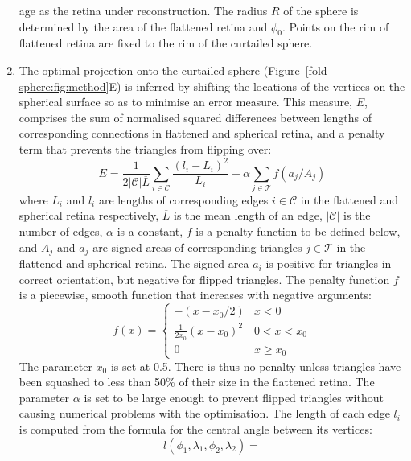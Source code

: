 \documentclass[10pt]{article}
\begin{document}
\begin{enumerate}
  age as the retina under reconstruction. The radius $R$ of the sphere
  is determined by the area of the flattened retina and $\phi_0$.
  Points on the rim of flattened retina are fixed to the rim of the
  curtailed sphere.
\item The optimal projection onto the curtailed sphere
  (Figure~\ref{fold-sphere:fig:method}E) is inferred by shifting the
  locations of the vertices on the spherical surface so as to minimise
  an error measure. This measure, $E$, comprises the sum of normalised
  squared differences between lengths of corresponding connections in
  flattened and spherical retina, and a penalty term that prevents the
  triangles from flipping over:
  \begin{equation}
    E = \frac{1}{2|\mathcal{C}|\overline{L}} \sum_{i\in\mathcal{C}} \frac{(l_i - L_i)^2}{L_i}  
    + \alpha\sum_{j\in\mathcal{T}} f(a_j/A_j)
  \end{equation}
  where $L_i$ and $l_i$ are lengths of corresponding edges
  $i\in\mathcal{C}$ in the flattened and spherical retina
  respectively, $\overline{L}$ is the mean length of an edge,
  $|\mathcal{C}|$ is the number of edges, $\alpha$ is a constant, $f$
  is a penalty function to be defined below, and $A_j$ and $a_j$ are
  signed areas of corresponding triangles $j\in\mathcal{T}$ in the
  flattened and spherical retina.  The signed area $a_i$ is positive
  for triangles in correct orientation, but negative for flipped
  triangles. The penalty function $f$ is a piecewise, smooth function
  that increases with negative arguments:
  \begin{equation}
    \label{retistruct_plos:eq:1}
    f(x) = \left\{
        \begin{array}{ll}
          -(x - x_0/2) & x < 0 \\
          \frac{1}{2x_0}(x - x_0)^2 & 0 < x <x_0 \\
          0 & x \ge x_0
          \end{array} \right.
  \end{equation}
  The parameter $x_0$ is set at 0.5. There is thus no penalty unless
  triangles have been squashed to less than 50\% of their size in the
  flattened retina.  The parameter $\alpha$ is set to be large enough
  to prevent flipped triangles without causing numerical problems with
  the optimisation. The length of each edge $l_i$ is computed from the
  formula for the central angle between its vertices:
  \begin{equation}
    \label{retistruct_plos:eq:2}
    l(\phi_1, \lambda_1, \phi_2, \lambda_2) =

\end{equation}
\end{enumerate}
\end{document}
